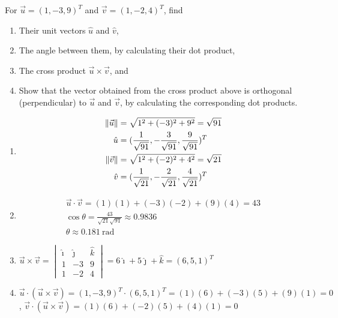 \begin{Exercise}
For $\vec{u} = (1, -3, 9)^T$ and $\vec{v} = (1, -2, 4)^T$, find
\begin{enumerate}[label=(\alph*)]
\item Their unit vectors $\hat{u}$ and $\hat{v}$,
\item The angle between them, by calculating their dot product,
\item The cross product $\vec{u} \times \vec{v}$, and 
\item Show that the vector obtained from the cross product above is orthogonal (perpendicular) to $\vec{u}$ and $\vec{v}$, by calculating the corresponding dot products.
\end{enumerate}
\end{Exercise}
\begin{Answer}
\begin{enumerate}[label=(\alph*)]
\item 
\begin{align*}
\norm{\vec{u}} &= \sqrt{1^2 + (-3)^2 + 9^2} = \sqrt{91} \\
\hat{u} &= (\frac{1}{\sqrt{91}}, -\frac{3}{\sqrt{91}}, \frac{9}{\sqrt{91}})^T \\
\norm{\vec{v}} &= \sqrt{1^2 + (-2)^2 + 4^2} = \sqrt{21} \\
\hat{v} &= (\frac{1}{\sqrt{21}}, -\frac{2}{\sqrt{21}}, \frac{4}{\sqrt{21}})^T  
\end{align*}
\item 
\begin{align*}
\vec{u} \cdot \vec{v} = (1)(1) + (-3)(-2) + (9)(4) = 43 \\
\cos\theta = \frac{43}{\sqrt{21}\sqrt{91}} \approx 0.9836 \\
\theta \approx \SI{0.181}{\radian}    
\end{align*}
\item $\vec{u} \times \vec{v} = \begin{vmatrix}
\hat{\imath} & \hat{\jmath} & \hat{k}\\
1 & -3 & 9\\
1 & -2 & 4
\end{vmatrix}
= 6\hat{\imath} + 5\hat{\jmath} + \hat{k} = (6, 5, 1)^T$
\item $\vec{u} \cdot (\vec{u} \times \vec{v}) = (1, -3, 9)^T \cdot (6, 5, 1)^T = (1)(6) + (-3)(5) + (9)(1) = 0$, $\vec{v} \cdot (\vec{u} \times \vec{v}) = (1)(6) + (-2)(5) + (4)(1) = 0$
\end{enumerate}
\end{Answer}

